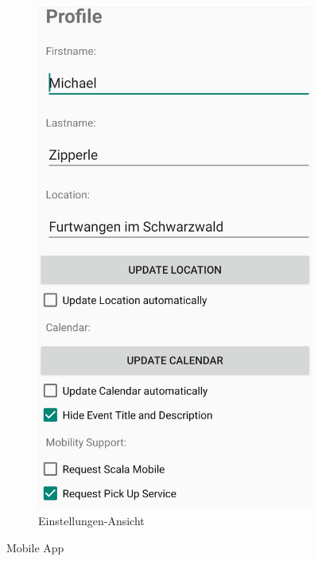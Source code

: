 \begin{figure}[!ht]
\begin{subfigure}[t]{0.48\linewidth}
		\includegraphics[width=1\linewidth]{Picture/MobileApp_Screenshot-4}
		\caption{Einstellungen-Ansicht}
		\label{fig:prototyp3}
	\end{subfigure}
	\caption{Mobile App}
	\label{fig:mobileapp}
\end{figure}